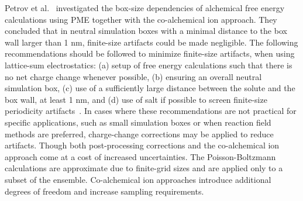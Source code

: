 \documentclass[9pt,bestpractices,pubversion]{livecoms}
\begin{document}
Petrov et al.~\cite{Petrov2024guidelines} investigated the box-size dependencies of alchemical free energy calculations using PME together with the co-alchemical ion approach. They concluded that in neutral simulation boxes with a minimal distance to the box wall larger than 1 nm, finite-size artifacts could be made negligible. The following recommendations should be followed to minimize finite-size artifacts, when using lattice-sum electrostatics: (a) setup of free energy calculations such that there is no net charge change whenever possible, (b) ensuring an overall neutral simulation box, (c) use of a sufficiently large distance between the solute and the box wall, at least 1 nm, and (d) use of salt if possible to screen finite-size periodicity artifacts~\cite{chen2018accurate}. In cases where these recommendations are not practical for specific applications, such as small simulation boxes or when reaction field methods are preferred, charge-change corrections may be applied to reduce artifacts. Though both post-processing corrections and the co-alchemical ion approach come at a cost of increased uncertainties. The Poisson-Boltzmann calculations are approximate due to finite-grid sizes and are applied only to a subset of the ensemble. Co-alchemical ion approaches introduce additional degrees of freedom and increase sampling requirements.
\end{document}
